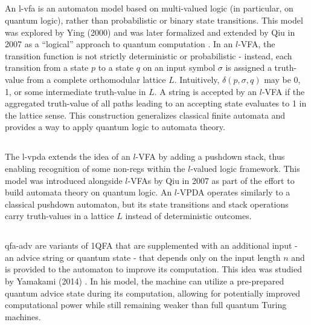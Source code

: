 \subsection{} 
An \gls{l-vfa} is an automaton model based on multi-valued logic (in particular, on quantum logic), rather than probabilistic or binary state transitions. This model was explored by Ying (2000) and was later formalized and extended by Qiu in 2007 as a “logical” approach to quantum computation \cite{qiu2007automata}. In an $l$-VFA, the transition function is not strictly deterministic or probabilistic - instead, each transition from a state $p$ to a state $q$ on an input symbol $\sigma$ is assigned a truth-value from a complete orthomodular lattice $L$. Intuitively, $\delta(p,\sigma,q)$ may be 0, 1, or some intermediate truth-value in $L$. A string is accepted by an $l$-VFA if the aggregated truth-value of all paths leading to an accepting state evaluates to 1 in the lattice sense. This construction generalizes classical finite automata and provides a way to apply quantum logic to automata theory.

\subsection{} 
The \gls{l-vpda} extends the idea of an $l$-VFA by adding a pushdown stack, thus enabling recognition of some non-\glspl{reg} within the $l$-valued logic framework. This model was introduced alongside $l$-VFAs by Qiu in 2007 \cite{qiu2007automata} as part of the effort to build automata theory on quantum logic. An $l$-VPDA operates similarly to a classical pushdown automaton, but its state transitions and stack operations carry truth-values in a lattice $L$ instead of deterministic outcomes.

\subsection{} 
\gls{qfa-adv} are variants of 1QFA that are supplemented with an additional input - an advice string or quantum state - that depends only on the input length $n$ and is provided to the automaton to improve its computation. This idea was studied by Yamakami (2014) \cite{yamakami2014one}. In his model, the machine can utilize a pre-prepared quantum advice state during its computation, allowing for potentially improved computational power while still remaining weaker than full quantum Turing machines.

